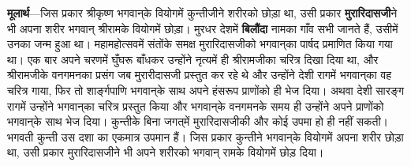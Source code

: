 \begin{sloppypar}\justifying{}
\textbf{मूलार्थ}—जिस प्रकार श्रीकृष्ण भगवान्‌के वियोगमें कुन्तीजीने शरीरको छोड़ा था, उसी प्रकार \textbf{मुरारिदासजी}ने भी अपना शरीर भगवान् श्रीरामके वियोगमें छोड़ा। मुरधर देशमें \textbf{बिलौंदा} नामका गाँव सभी जानते हैं, उसीमें उनका जन्म हुआ था। महा\-महोत्सवमें संतोंके समक्ष मुरारिदासजीको भगवान्‌का पार्षद प्रमाणित किया गया था। एक बार अपने चरणमें घुँघरू बाँधकर उन्होंने नृत्यमें ही श्रीरामजीका चरित्र दिखा दिया था, और श्रीरामजीके वनगमनका प्रसंग जब मुरारीदासजी प्रस्तुत कर रहे थे और उन्होंने देशी रागमें भगवान्‌का वह चरित्र गाया, फिर तो शार्ङ्गपाणि भगवान्‌के साथ अपने हंसरूप प्राणोंको ही भेज दिया। अथवा देशी सारङ्ग रागमें उन्होंने भगवान्‌का चरित्र प्रस्तुत किया और भगवान्‌के वनगमनके समय ही उन्होंने अपने प्राणोंको भगवान्‌के साथ भेज दिया। कुन्तीके बिना जगत्‌में मुरारिदासजीकी और कोई उपमा हो ही नहीं सकती। भगवती कुन्ती उस दशा का एकमात्र उपमान हैं। जिस प्रकार कुन्तीने भगवान्‌के वियोगमें अपना शरीर छोड़ा था, उसी प्रकार मुरारिदासजीने भी अपने शरीरको भगवान् रामके वियोगमें छोड़ दिया।
\end{sloppypar}


